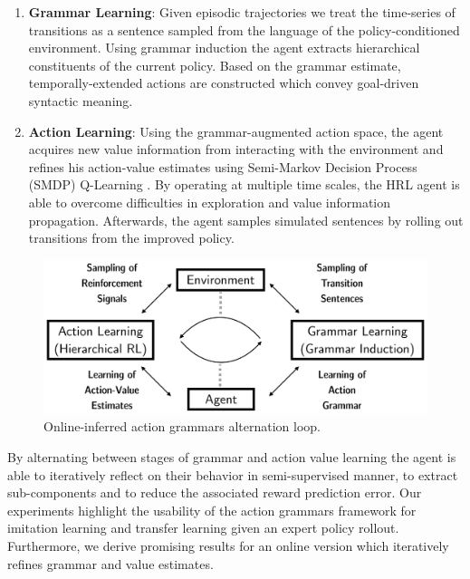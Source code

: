 \documentclass[10pt,letterpaper]{article}
\begin{document}
\begin{enumerate}
	\item \textbf{Grammar Learning}: Given episodic trajectories we treat the time-series of transitions as a sentence sampled from the language of the policy-conditioned environment. Using grammar induction \cite{Manning_1997, Siyari_2016b} the agent extracts hierarchical constituents of the current policy. Based on the grammar estimate, temporally-extended actions are constructed which convey goal-driven syntactic meaning.
	\item \textbf{Action Learning}: Using the grammar-augmented action space, the agent acquires new value information from interacting with the environment and refines his action-value estimates using Semi-Markov Decision Process (SMDP) Q-Learning \cite{Bradtke_1995}. By operating at multiple time scales, the HRL agent is able to overcome difficulties in exploration and value information propagation. Afterwards, the agent samples simulated sentences by rolling out transitions from the improved policy.
\end{enumerate}

\begin{figure}
    \centering
    \includegraphics[width=\linewidth]{figures/concept_al_gl.png}
    \caption{Online-inferred action grammars alternation loop.}
    \label{fig:loop_ag}
\end{figure}

By alternating between stages of grammar and action value learning the agent is able to iteratively reflect on their behavior in semi-supervised manner, to extract sub-components and to reduce the associated reward prediction error.
Our experiments highlight the usability of the action grammars framework for imitation learning and transfer learning given an expert policy rollout. Furthermore, we derive promising results for an online version which iteratively refines grammar and value estimates. 
\end{document}
